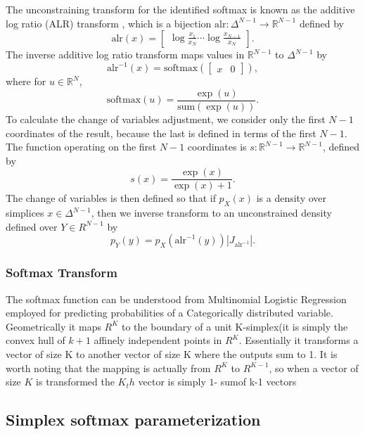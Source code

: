 \documentclass[11pt]{article}
\newcommand{\abs}[1]{\left| #1 \right|}
\newcommand{\absdet}[1]{\abs{#1}}
\begin{document}
The unconstraining transform for the identified softmax is known as
the additive log ratio (ALR) transform \cite{aitchison???}, which is a
bijection $\textrm{alr}:\Delta^{N-1} \rightarrow \mathbb{R}^{N-1}$ defined by
\[
  \textrm{alr}(x)
  = \begin{bmatrix}\displaystyle
    \log \frac{x_1}{x_N} \cdots \log \frac{x_{N-1}}{x_N}
  \end{bmatrix}.
\]
The inverse additive log ratio transform maps values in $\mathbb{R}^{N-1}$ to
$\Delta^{N-1}$ by
\[
  \textrm{alr}^{-1}(x) = \textrm{softmax}(\begin{bmatrix}x &  0\end{bmatrix}),
\]
where for $u \in \mathbb{R}^N$,
\[
  \textrm{softmax}(u) = \frac{\exp(u)}{\textrm{sum}(\exp(u))}.
\]
To calculate the change of variables adjustment, we consider only the
first $N-1$ coordinates of the result, because the last is defined in
terms of the first $N-1$.  The function operating on the first $N-1$
coordinates is $s:\mathbb{R}^{N-1} \rightarrow \mathbb{R}^{N-1}$, defined by
\[
  s(x) = \frac{\exp(x)}{\exp(x) + 1}.
\]
The change of variables is then defined so that if $p_X(x)$ is a
density over simplices $x \in \Delta^{N-1}$, then we inverse transform
to an unconstrained density defined over $Y \in R^{N-1}$ by
\[
  p_Y(y) = p_X(\textrm{alr}^{-1}(y)) \absdet{J_{\textrm{alr}^{-1}}}.
\]



  



\subsubsection{Softmax Transform}

The softmax function can be understood from Multinomial Logistic
Regression employed for predicting probabilities of a Categorically
distributed variable. Geometrically it maps $R^K$ to the boundary of a
unit K-simplex(it is simply the convex hull of $k+1$ affinely
independent points in $R^K$. Essentially it transforms a vector of
size K to another vector of size K where the outputs sum to 1. It is
worth noting that the mapping is actually from $R^K$ to $R^{K-1}$, so
when a vector of size $K$ is transformed the $K_th$ vector is simply
$1$- sumof k-1 vectors


\subsection{Simplex softmax parameterization}
\end{document}
